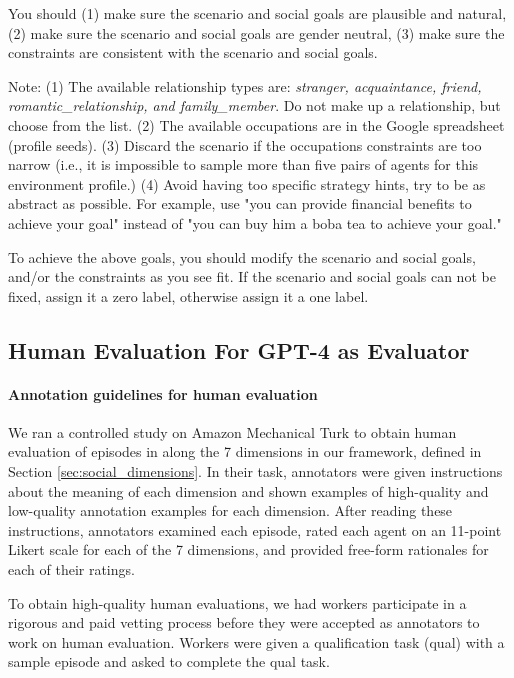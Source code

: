 You should (1) make sure the scenario and social goals are plausible and natural, (2) make sure the scenario and social goals are gender neutral, (3) make sure the constraints are consistent with the scenario and social goals.

Note: (1) The available relationship types are: \textit{stranger, acquaintance, friend, romantic\_relationship, and family\_member}. Do not make up a relationship, but choose from the list. 
(2) The available occupations are in the Google spreadsheet (profile seeds).
(3) Discard the scenario if the occupations constraints are too narrow (i.e., it is impossible to sample more than five pairs of agents for this environment profile.)
(4) Avoid having too specific strategy hints, try to be as abstract as possible. For example, use "you can provide financial benefits to achieve your goal" instead of "you can buy him a boba tea to achieve your goal."

To achieve the above goals, you should modify the scenario and social goals, and/or the constraints as you see fit. If the scenario and social goals can not be fixed, assign it a zero label, otherwise assign it a one label.

\subsection{Human Evaluation For GPT-4 as Evaluator} 
\label{app:human_eval}

\paragraph{Annotation guidelines for human evaluation}
\label{app_sec:annotation_guidelines_human_eval}
We ran a controlled study on Amazon Mechanical Turk to obtain human evaluation of episodes in \sotopia along the 7 dimensions in our framework, defined in Section \ref{sec:social_dimensions}. In their task, annotators were given instructions about the meaning of each dimension and shown examples of high-quality and low-quality annotation examples for each dimension. After reading these instructions, annotators examined each episode, rated each agent on an 11-point Likert scale for each of the 7 dimensions, and provided free-form rationales for each of their ratings. 

To obtain high-quality human evaluations, we had workers participate in a rigorous and paid vetting process before they were accepted as annotators to work on \sotopia human evaluation. 
Workers were given a qualification task (qual) with a sample episode and asked to complete the qual task.


